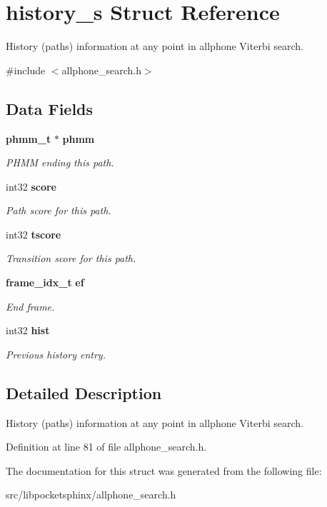 \section{history\+\_\+s Struct Reference}
\label{structhistory__s}


History (paths) information at any point in allphone Viterbi search.  




{\ttfamily \#include $<$allphone\+\_\+search.\+h$>$}

\subsection*{Data Fields}
\begin{DoxyCompactItemize}
\item 
\mbox{\label{structhistory__s_a548a5d7505c78278114ab9b1d5e0ceaa}} 
\textbf{ phmm\+\_\+t} $\ast$ \textbf{ phmm}
\begin{DoxyCompactList}\small\item\em P\+H\+MM ending this path. \end{DoxyCompactList}\item 
\mbox{\label{structhistory__s_af24720abad5e2e17a99c5aeffa7dc95e}} 
int32 \textbf{ score}
\begin{DoxyCompactList}\small\item\em Path score for this path. \end{DoxyCompactList}\item 
\mbox{\label{structhistory__s_a09096eb94eba8ad29dc19f231192a24b}} 
int32 \textbf{ tscore}
\begin{DoxyCompactList}\small\item\em Transition score for this path. \end{DoxyCompactList}\item 
\mbox{\label{structhistory__s_a59e1a1053ba224c4d015f08192c7fd96}} 
\textbf{ frame\+\_\+idx\+\_\+t} \textbf{ ef}
\begin{DoxyCompactList}\small\item\em End frame. \end{DoxyCompactList}\item 
\mbox{\label{structhistory__s_a0e9457246e140d8af571eea044178551}} 
int32 \textbf{ hist}
\begin{DoxyCompactList}\small\item\em Previous history entry. \end{DoxyCompactList}\end{DoxyCompactItemize}


\subsection{Detailed Description}
History (paths) information at any point in allphone Viterbi search. 

Definition at line 81 of file allphone\+\_\+search.\+h.



The documentation for this struct was generated from the following file\+:\begin{DoxyCompactItemize}
\item 
src/libpocketsphinx/allphone\+\_\+search.\+h\end{DoxyCompactItemize}
